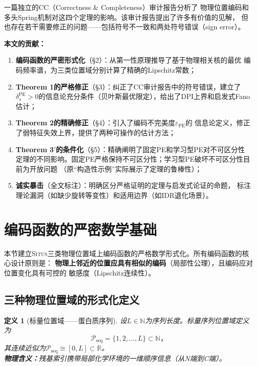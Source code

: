 \documentclass[11pt,a4paper]{article}
\newtheorem{definition}[theorem]{定义}
\theoremstyle{remark}
\DeclareMathOperator{\PE}{PE}
\newcommand{\R}{\mathbb{R}}
\newcommand{\N}{\mathbb{N}}
\newcommand{\Ppos}{\mathcal{P}}
\newcommand{\Situs}{\textsc{Situs}}
\begin{document}
一篇独立的CC（Correctness \& Completeness）审计报告\cite{scx2026cc_audit}分析了
物理位置编码和多头Spring机制对这四个定理的影响。该审计报告提出了许多有价值的见解，
但也存在若干需要修正的问题——包括符号不一致和两处符号错误（sign error）。

\textbf{本文的贡献：}
\begin{enumerate}[label=(\arabic*)]
    \item \textbf{编码函数的严密形式化}（\S2）：从第一性原理推导了基于物理相关核的最优
          编码频率谱，为三类位置域分别计算了精确的Lipschitz常数；
    \item \textbf{Theorem 1的严格修正}（\S3）：纠正了CC审计报告中的符号错误，建立了
          $\delta_s^{\PE} > 0$的信息论充分条件（贝叶斯最优限定），给出了DPI上界和启发式Fano估计；
    \item \textbf{Theorem 2的精确修正}（\S4）：引入了编码不完美度$\varepsilon_{\PE}$的
          信息论定义，修正了弱特征失效上界，提供了两种可操作的估计方法；
    \item \textbf{Theorem 3$'$的条件化}（\S5）：精确阐明了固定PE和学习型PE对不可区分性
          定理的不同影响。固定PE严格保持不可区分性；学习型PE破坏不可区分性目前为开放问题
          （原``构造性示例''实际展示了定理的鲁棒性）；
    \item \textbf{诚实暴击}（全文标注）：明确区分严格证明的定理与启发式论证的命题，
          标注理论漏洞（如缺少旋转等变性）和适用边界（如IDR退化场景）。
\end{enumerate}

\section{编码函数的严密数学基础}

本节建立\Situs{}三类物理位置域上编码函数的严格数学形式化。所有编码函数的核心设计原则是：
\textbf{物理上邻近的位置应具有相似的编码}（局部性公理），且编码应对位置变化具有可控的
敏感度（Lipschitz连续性）。

\subsection{三种物理位置域的形式化定义}

\begin{definition}[标量位置域——蛋白质序列]
\label{def:1.1.1}
设$L \in \N$为序列长度。标量序列位置域定义为
\begin{equation}
    \Ppos_{\text{seq}} = \{1, 2, \ldots, L\} \subset \N，
\end{equation}
其连续近似为$\Ppos_{\text{seq}} \cong [0, L] \subset \R$。\\
\textbf{物理含义：}残基索引携带局部化学环境的一维顺序信息（从N端到C端）。
\end{definition}
\end{document}
